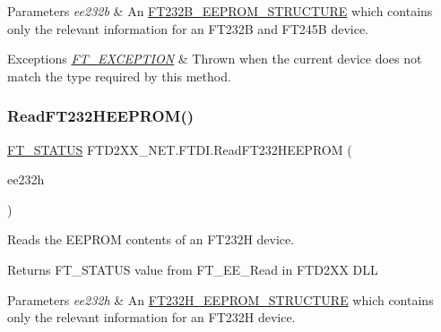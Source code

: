 \begin{DoxyParams}{Parameters}
{\em ee232b} & An \mbox{\hyperlink{class_f_t_d2_x_x___n_e_t_1_1_f_t_d_i_1_1_f_t232_b___e_e_p_r_o_m___s_t_r_u_c_t_u_r_e}{F\+T232\+B\+\_\+\+E\+E\+P\+R\+O\+M\+\_\+\+S\+T\+R\+U\+C\+T\+U\+RE}} which contains only the relevant information for an F\+T232B and F\+T245B device.\\
\hline
\end{DoxyParams}

\begin{DoxyExceptions}{Exceptions}
{\em \mbox{\hyperlink{class_f_t_d2_x_x___n_e_t_1_1_f_t_d_i_1_1_f_t___e_x_c_e_p_t_i_o_n}{F\+T\+\_\+\+E\+X\+C\+E\+P\+T\+I\+ON}}} & Thrown when the current device does not match the type required by this method.\\
\hline
\end{DoxyExceptions}
\mbox{\label{class_f_t_d2_x_x___n_e_t_1_1_f_t_d_i_aa0d6fbd8c14599a8b0904c8384dcdcfc}} 
\subsubsection{\texorpdfstring{ReadFT232HEEPROM()}{ReadFT232HEEPROM()}}
{\footnotesize\ttfamily \mbox{\hyperlink{class_f_t_d2_x_x___n_e_t_1_1_f_t_d_i_aabe20ad905cc4ccc1e35dd5b877d9a83}{F\+T\+\_\+\+S\+T\+A\+T\+US}} F\+T\+D2\+X\+X\+\_\+\+N\+E\+T.\+F\+T\+D\+I.\+Read\+F\+T232\+H\+E\+E\+P\+R\+OM (\begin{DoxyParamCaption}\item[{\mbox{\hyperlink{class_f_t_d2_x_x___n_e_t_1_1_f_t_d_i_1_1_f_t232_h___e_e_p_r_o_m___s_t_r_u_c_t_u_r_e}{F\+T232\+H\+\_\+\+E\+E\+P\+R\+O\+M\+\_\+\+S\+T\+R\+U\+C\+T\+U\+RE}}}]{ee232h }\end{DoxyParamCaption})}



Reads the E\+E\+P\+R\+OM contents of an F\+T232H device. 

\begin{DoxyReturn}{Returns}
F\+T\+\_\+\+S\+T\+A\+T\+US value from F\+T\+\_\+\+E\+E\+\_\+\+Read in F\+T\+D2\+XX D\+LL
\end{DoxyReturn}

\begin{DoxyParams}{Parameters}
{\em ee232h} & An \mbox{\hyperlink{class_f_t_d2_x_x___n_e_t_1_1_f_t_d_i_1_1_f_t232_h___e_e_p_r_o_m___s_t_r_u_c_t_u_r_e}{F\+T232\+H\+\_\+\+E\+E\+P\+R\+O\+M\+\_\+\+S\+T\+R\+U\+C\+T\+U\+RE}} which contains only the relevant information for an F\+T232H device.\\
\hline
\end{DoxyParams}


